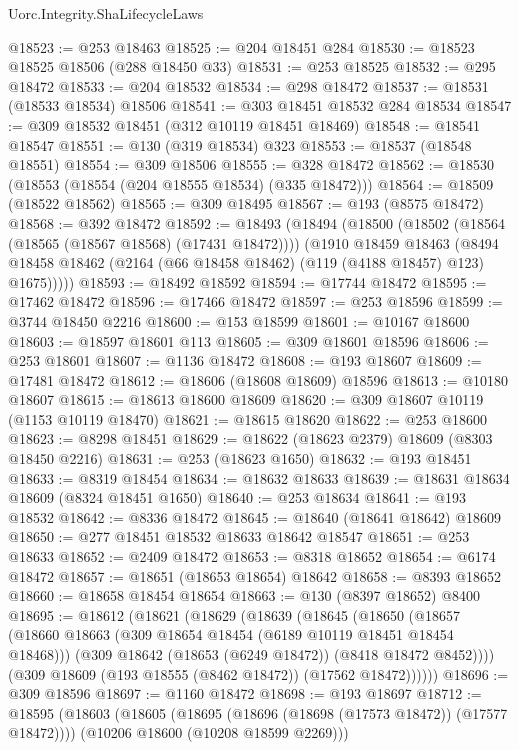 \begin{lexlean}{Uorc.Integrity.ShaLifecycleLaws}
\begin{coremodule}
@18523 := @253 @18463
@18525 := @204 @18451 @284
@18530 := @18523 @18525 @18506 (@288 @18450 @33)
@18531 := @253 @18525
@18532 := @295 @18472
@18533 := @204 @18532
@18534 := @298 @18472
@18537 := @18531 (@18533 @18534) @18506
@18541 := @303 @18451 @18532 @284 @18534
@18547 := @309 @18532 @18451 (@312 @10119 @18451 @18469)
@18548 := @18541 @18547
@18551 := @130 (@319 @18534) @323
@18553 := @18537 (@18548 @18551)
@18554 := @309 @18506
@18555 := @328 @18472
@18562 := @18530 (@18553 (@18554 (@204 @18555 @18534) (@335 @18472)))
@18564 := @18509 (@18522 @18562)
@18565 := @309 @18495
@18567 := @193 (@8575 @18472)
@18568 := @392 @18472
@18592 := @18493
    (@18494
      (@18500
        (@18502 (@18564 (@18565 (@18567 @18568) (@17431 @18472))))
        (@1910
          @18459
          @18463
          (@8494 @18458 @18462 (@2164 (@66 @18458 @18462) (@119 (@4188 @18457) @123) @1675)))))
@18593 := @18492 @18592
@18594 := @17744 @18472
@18595 := @17462 @18472
@18596 := @17466 @18472
@18597 := @253 @18596
@18599 := @3744 @18450 @2216
@18600 := @153 @18599
@18601 := @10167 @18600
@18603 := @18597 @18601 @113
@18605 := @309 @18601 @18596
@18606 := @253 @18601
@18607 := @1136 @18472
@18608 := @193 @18607
@18609 := @17481 @18472
@18612 := @18606 (@18608 @18609) @18596
@18613 := @10180 @18607
@18615 := @18613 @18600 @18609
@18620 := @309 @18607 @10119 (@1153 @10119 @18470)
@18621 := @18615 @18620
@18622 := @253 @18600
@18623 := @8298 @18451
@18629 := @18622 (@18623 @2379) @18609 (@8303 @18450 @2216)
@18631 := @253 (@18623 @1650)
@18632 := @193 @18451
@18633 := @8319 @18454
@18634 := @18632 @18633
@18639 := @18631 @18634 @18609 (@8324 @18451 @1650)
@18640 := @253 @18634
@18641 := @193 @18532
@18642 := @8336 @18472
@18645 := @18640 (@18641 @18642) @18609
@18650 := @277 @18451 @18532 @18633 @18642 @18547
@18651 := @253 @18633
@18652 := @2409 @18472
@18653 := @8318 @18652
@18654 := @6174 @18472
@18657 := @18651 (@18653 @18654) @18642
@18658 := @8393 @18652
@18660 := @18658 @18454 @18654
@18663 := @130 (@8397 @18652) @8400
@18695 := @18612
    (@18621
      (@18629
        (@18639
          (@18645
            (@18650
              (@18657
                (@18660 @18663 (@309 @18654 @18454 (@6189 @10119 @18451 @18454 @18468)))
                (@309 @18642 (@18653 (@6249 @18472)) (@8418 @18472 @8452))))
            (@309 @18609 (@193 @18555 (@8462 @18472)) (@17562 @18472))))))
@18696 := @309 @18596
@18697 := @1160 @18472
@18698 := @193 @18697
@18712 := @18595
    (@18603
      (@18605 (@18695 (@18696 (@18698 (@17573 @18472)) (@17577 @18472))))
      (@10206 @18600 (@10208 @18599 @2269)))

\end{coremodule}
\end{lexlean}
